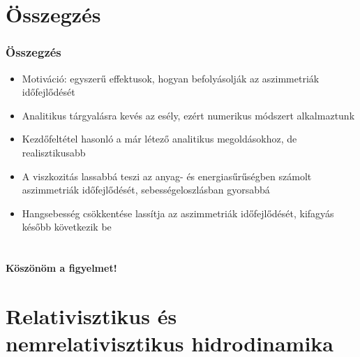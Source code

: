 \documentclass{beamer}
\begin{document}
\section{Összegzés}
\begin{frame}
\frametitle{Összegzés}
\begin{itemize}
\setlength{\itemsep}{16pt}
\item<1-> Motiváció: egyszerű effektusok, hogyan befolyásolják az aszimmetriák időfejlődését
\item<1-> Analitikus tárgyalásra kevés az esély, ezért numerikus módszert alkalmaztunk
\item<2-> Kezdőfeltétel hasonló a már létező analitikus megoldásokhoz, de realisztikusabb
\item<3-> A viszkozitás lassabbá teszi az anyag- és energiasűrűségben számolt aszimmetriák időfejlődését, sebességeloszlásban gyorsabbá
\item<4-> Hangsebesség csökkentése lassítja az aszimmetriák időfejlődését, kifagyás később következik be
\end{itemize}
\end{frame}

\section{}
\begin{frame}
\begin{center}
\textbf{\huge{Köszönöm a figyelmet!}}
\end{center}
\end{frame}

\section{Relativisztikus és nemrelativisztikus hidrodinamika}
\end{document}
